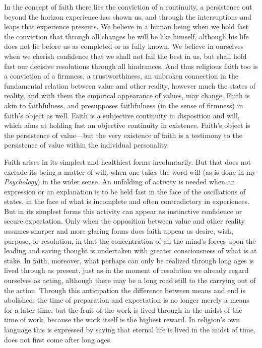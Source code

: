 \documentclass[12pt,a4paper]{book}
\newcommand{\opage}[1]{\marginnote{\footnotesize\textit{[#1]}}}
\begin{document}
In the concept of faith there lies the conviction of a continuity, a persistence
out beyond the horizon experience has shown us, and through the interruptions
and leaps that experience presents. We believe in a human being when we hold
fast the conviction that through all changes he will be like himself, although
his life does not lie before us as completed or as fully known. We believe in
ourselves when we cherish confidence that we shall not fail the best in us, but
shall hold fast our decisive resolutions through all hindrances. And thus
religious faith too is a conviction of a firmness, a trustworthiness, an
unbroken connection in the fundamental relation between value and other reality,
however much the states of reality, and with them the empirical appearance of
values, may change. Faith is akin to faithfulness, and presupposes faithfulness
(in the sense of firmness) in faith's object as well. Faith is a subjective
continuity in disposition and will, which aims at holding fast an objective
continuity in existence. Faith's object is the persistence of value---but the
very existence of faith is a testimony to the persistence of value within the
individual personality.

Faith arises in its simplest and healthiest forms involuntarily. But that does
not exclude its being a matter of will, when one 
\opage{71}takes the word will (as is done
in my \emph{Psychology}) in the wider sense. An unfolding of activity is needed
when an expression or an explanation is to be held fast in the face of the
oscillations of states, in the face of what is incomplete and often
contradictory in experiences. But in its simplest forms this activity can appear
as instinctive confidence or secure expectation. Only when the opposition
between value and other reality assumes sharper and more glaring forms does
faith appear as desire, wish, purpose, or resolution, in that the concentration
of all the mind's forces upon the leading and saving thought is undertaken with
greater consciousness of what is at stake. In faith, moreover, what perhaps can
only be realized through long ages is lived through as present, just as in the
moment of resolution we already regard ourselves as acting, although there may
be a long road still to the carrying out of the action. Through this
anticipation the difference between means and end is abolished; the time of
preparation and expectation is no longer merely a means for a later time, but
the fruit of the work is lived through in the midst of the time of work, because
the work itself is the highest reward. In religion's own language this is
expressed by saying that eternal life is lived in the midst of time, does not
first come after long ages.
\end{document}
